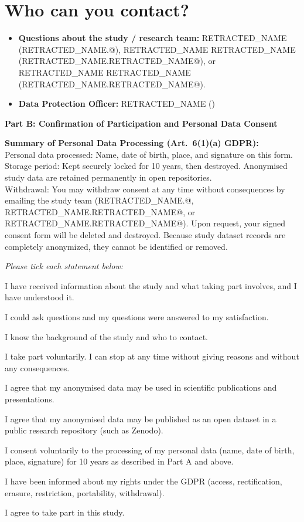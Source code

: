 \section{Who can you contact?}
\begin{itemize}[leftmargin=1.5em, itemsep=0pt, parsep=0pt, topsep=2pt]
  \item \textbf{Questions about the study / research team:} RETRACTED_NAME  (RETRACTED_NAME.@), RETRACTED_NAME RETRACTED_NAME (RETRACTED_NAME.RETRACTED_NAME@), or RETRACTED_NAME RETRACTED_NAME (RETRACTED_NAME.RETRACTED_NAME@).
  \item \textbf{Data Protection Officer:} RETRACTED_NAME ()
\end{itemize}

\clearpage
{\Large\bfseries Part B: Confirmation of Participation and Personal Data Consent}
\vspace{0.5em}

\begin{infobox}
\small
\textbf{Summary of Personal Data Processing (Art.~6(1)(a) GDPR):}\\
Personal data processed: Name, date of birth, place, and signature on this form.\\
Storage period: Kept securely locked for 10 years, then destroyed. Anonymised study data are retained permanently in open repositories.\\
Withdrawal: You may withdraw consent at any time without consequences by emailing the study team (RETRACTED_NAME.@, RETRACTED_NAME.RETRACTED_NAME@, or RETRACTED_NAME.RETRACTED_NAME@). Upon request, your signed consent form will be deleted and destroyed. Because study dataset records are completely anonymized, they cannot be identified or removed.
\end{infobox}

\emph{Please tick each statement below:}
\begin{consentitems}
  \item I have received information about the study and what taking part involves, and I have understood it.
  \item I could ask questions and my questions were answered to my satisfaction.
  \item I know the background of the study and who to contact.
  \item I take part voluntarily. I can stop at any time without giving reasons and without any consequences.
  \item I agree that my anonymised data may be used in scientific publications and presentations.
  \item I agree that my anonymised data may be published as an open dataset in a public research repository (such as Zenodo).
  \item I consent voluntarily to the processing of my personal data (name, date of birth, place, signature) for 10 years as described in Part A and above.
  \item I have been informed about my rights under the GDPR (access, rectification, erasure, restriction, portability, withdrawal).
  \item I agree to take part in this study.
\end{consentitems}

